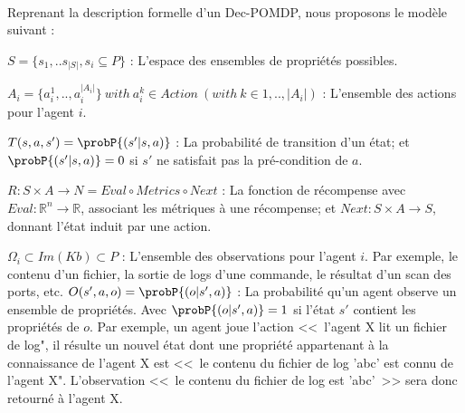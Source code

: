 \ 

Reprenant la description formelle d'un Dec-POMDP\cite{OliehoekA16}, nous proposons le modèle suivant :

 $S = \{s_1, ..s_{|S|}, s_{i} \subseteq P\}$ : L'espace des ensembles de propriétés possibles.

 $A_i = \{a_{i}^{1},..,a_{i}^{|A_{i}|}\} \: with \: a_{i}^k \in Action \: (with \: k \in {1, .., |A_i|})$ : L'ensemble des actions pour l'agent $i$.
 
 $T(s,a,s') = \probP{(s'|s,a)}$ : La probabilité de transition d'un état; et $\probP{(s'|s,a)} = 0$ si $s'$ ne satisfait pas la pré-condition de $a$.

 $R: S \times A \rightarrow N = Eval \circ Metrics \circ Next$ : La fonction de récompense avec $Eval: \mathbb{R}^n \rightarrow \mathbb{R}$, associant les métriques à une récompense; et $Next: S \times A \rightarrow S$, donnant l'état induit par une action.

 $\Omega_i \subset Im(Kb) \subset P$ : L'ensemble des observations pour l'agent $i$. Par exemple, le contenu d'un fichier, la sortie de logs d'une commande, le résultat d'un scan des ports, etc.
 $O(s',a,o) = \probP{(o|s',a)}$ : La probabilité qu'un agent observe un ensemble de propriétés. Avec $\probP{(o|s',a)} = 1$ si l'état $s'$ contient les propriétés de $o$.
 Par exemple, un agent joue l'action <<~l'agent X lit un fichier de log", il résulte un nouvel état dont une propriété appartenant à la connaissance de l'agent X est <<~le contenu du fichier de log 'abc' est connu de l'agent X". L'observation <<~le contenu du fichier de log est 'abc'~>> sera donc retourné à l'agent X.

\ 












